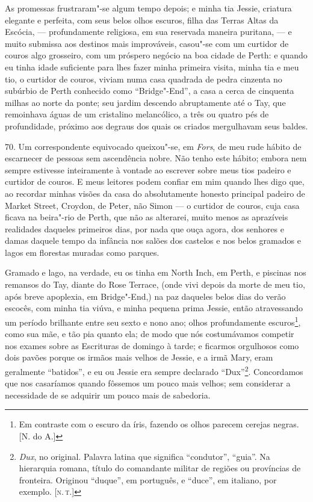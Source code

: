 As promessas frustraram"-se algum tempo depois; e minha tia Jessie,
criatura elegante e perfeita, com seus belos olhos escuros, filha das
Terras Altas da Escócia, --- profundamente religiosa, em sua reservada
maneira puritana, --- e muito submissa aos destinos mais improváveis,
casou"-se com um curtidor de couros algo grosseiro, com um próspero
negócio na boa cidade de Perth: e quando eu tinha idade suficiente para
lhes fazer minha primeira visita, minha tia e meu tio, o curtidor de
couros, viviam numa casa quadrada de pedra cinzenta no subúrbio de Perth
conhecido como ``Bridge"-End'', a casa a cerca de cinquenta milhas ao
norte da ponte; seu jardim descendo abruptamente até o Tay, que
remoinhava águas de um cristalino melancólico, a três ou quatro pés de
profundidade, próximo aos degraus dos quais os criados mergulhavam seus
baldes.

70. Um correspondente equivocado queixou"-se, em \emph{Fors}, de meu rude
hábito de escarnecer de pessoas sem ascendência nobre. Não tenho este
hábito; embora nem sempre estivesse inteiramente à vontade ao escrever
sobre meus tios padeiro e curtidor de couros. E meus leitores podem
confiar em mim quando lhes digo que, ao recordar minhas visões da casa
do absolutamente honesto principal padeiro de Market Street, Croydon, de
Peter, não Simon --- o curtidor de couros, cuja casa ficava na beira"-rio
de Perth, que não as alterarei, muito menos as aprazíveis realidades
daqueles primeiros dias, por nada que ouça agora, dos senhores e damas
daquele tempo da infância nos salões dos castelos e nos belos gramados e
lagos em florestas muradas como parques.

Gramado e lago, na verdade, eu os tinha em North Inch, em Perth, e
piscinas nos remansos do Tay, diante do Rose Terrace, (onde vivi depois
da morte de meu tio, após breve apoplexia, em Bridge"-End,) na paz
daqueles belos dias do verão escocês, com minha tia viúva, e minha
pequena prima Jessie, então atravessando um período brilhante entre seu
sexto e nono ano; olhos profundamente escuros\footnote{Em contraste com
  o escuro da íris, fazendo os olhos parecem cerejas negras. {[}N. do
  A.{]}}, como sua mãe, e tão pia quanto ela; de modo que nós
costumávamos competir nos exames sobre as Escrituras de domingo à tarde;
e ficarmos orgulhosos como dois pavões porque os irmãos mais velhos de
Jessie, e a irmã Mary, eram geralmente ``batidos'', e eu ou Jessie era
sempre declarado ``Dux''\footnote{\emph{Dux}, no original. Palavra
  latina que significa ``condutor'', ``guia''. Na hierarquia romana,
  título do comandante militar de regiões ou províncias de fronteira.
  Originou ``duque'', em português, e ``duce'', em italiano, por
  exemplo. {[}\textsc{n.\,t.}{]}}. Concordamos que nos casaríamos quando
fôssemos um pouco mais velhos; sem considerar a necessidade de se
adquirir um pouco mais de sabedoria.

